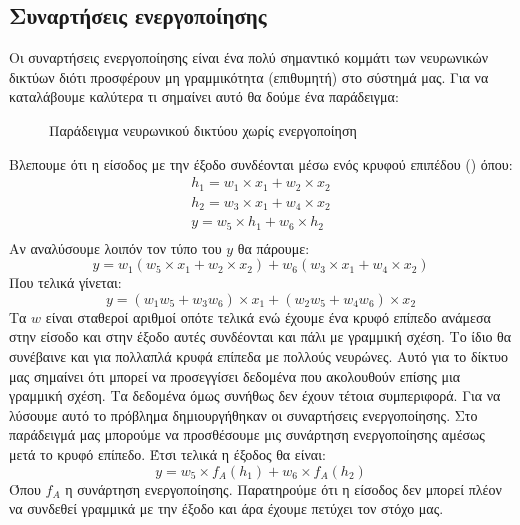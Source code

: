 \subsection{Συναρτήσεις ενεργοποίησης}
Οι συναρτήσεις ενεργοποίησης είναι ένα πολύ σημαντικό κομμάτι των νευρωνικών δικτύων διότι προσφέρουν μη γραμμικότητα (επιθυμητή) στο σύστημά μας. Για να καταλάβουμε καλύτερα τι σημαίνει αυτό θα δούμε ένα παράδειγμα\cite{nnactmlm}:
\begin{figure}[H]
    \centering
    \caption{Παράδειγμα νευρωνικού δικτύου χωρίς ενεργοποίηση}
\end{figure}

Βλεπουμε ότι η είσοδος με την έξοδο συνδέονται μέσω ενός κρυφού επιπέδου () όπου:
\begin{gather*}
    h_1=w_1\times x_1+w_2\times x_2 \\
    h_2=w_3\times x_1+w_4\times x_2 \\
    y=w_5\times h_1+w_6\times h_2 \\
\end{gather*}
Αν αναλύσουμε λοιπόν τον τύπο του $y$ θα πάρουμε:
$$y=w_1(w_5\times x_1+w_2\times x_2) + w_6(w_3\times x_1+w_4\times x_2)$$
Που τελικά γίνεται:
$$y=(w_1w_5+w_3w_6)\times x_1+(w_2w_5+w_4w_6)\times x_2$$
Τα $w$ είναι σταθεροί αριθμοί οπότε τελικά ενώ έχουμε ένα κρυφό επίπεδο ανάμεσα στην είσοδο και στην έξοδο αυτές συνδέονται και πάλι με γραμμική σχέση. Το ίδιο θα συνέβαινε και για πολλαπλά κρυφά επίπεδα με πολλούς νευρώνες. Αυτό για το
δίκτυο μας σημαίνει ότι μπορεί να προσεγγίσει δεδομένα που ακολουθούν επίσης μια γραμμική σχέση. Τα δεδομένα όμως συνήθως δεν έχουν τέτοια συμπεριφορά. Για να λύσουμε αυτό το πρόβλημα δημιουργήθηκαν οι συναρτήσεις ενεργοποίησης. Στο
παράδειγμά μας μπορούμε να προσθέσουμε μις συνάρτηση ενεργοποίησης αμέσως μετά το κρυφό επίπεδο. Έτσι τελικά η έξοδος θα είναι:
$$y=w_5\times f_A(h_1)+w_6\times f_A(h_2)$$
Όπου $f_A$ η συνάρτηση ενεργοποίησης. Παρατηρούμε ότι η είσοδος δεν μπορεί πλέον να συνδεθεί γραμμικά με την έξοδο και άρα έχουμε πετύχει τον στόχο μας.

